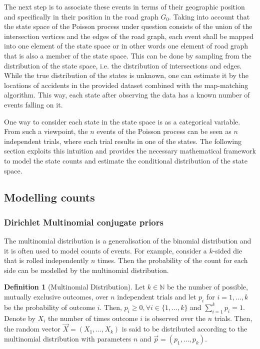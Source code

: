 \documentclass[12pt]{article}
\theoremstyle{definition}
\newtheorem{definition}{Definition}[section]
\begin{document}
The next step is to associate these events in terms of their geographic position and specifically in their position in the road graph $G_0$. Taking into account that the state space of the Poisson process under question consists of the union of the intersection vertices and the edges of the road graph, each event shall be mapped into one element of the state space or in other words one element of road graph that is also a member of the state space. This can be done by sampling from the distribution of the state space, i.e. the distribution of intersections and edges. While the true distribution of the states is unknown, one can estimate it by the locations of accidents in the provided dataset combined with the map-matching algorithm. This way, each state after observing the data has a known number of events falling on it. 

One way to consider each state in the state space is as a categorical variable. From such a viewpoint, the $n$ events of the Poisson process can be seen as $n$ independent trials, where each trial results in one of the states. The following section exploits this intuition and provides the necessary mathematical framework to model the state counts and estimate the conditional distribution of the state space. 

\subsection{Modelling counts}
\subsubsection{Dirichlet Multinomial conjugate priors}
The multinomial distribution is a generalisation of the binomial distribution and it is often used to model counts of events. For example, consider a $k$-sided die that is rolled independently $n$ times. Then the probability of the count for each side can be modelled by the multinomial distribution.  

\begin{definition}[Multinomial Distribution]
    Let $k\in \mathbb{N}$ be the number of possible, mutually exclusive outcomes, over $n$ independent trials and let $p_i$ for $i=1,...,k$ be the probability of outcome $i$. Then, $p_i\geq 0, \forall i\in \{1,...,k\}$ and $\sum_{i=1}^k p_i=1$. Denote by $X_i$ the number of times outcome $i$ is observed over the $n$ trials. Then, the random vector $\Vec{X}=(X_1,...,X_k)$ is said to be distributed according to the multinomial distribution with parameters $n$ and $\Vec{p}=(p_1,...,p_k)$. 
\end{definition}  
\end{document}
